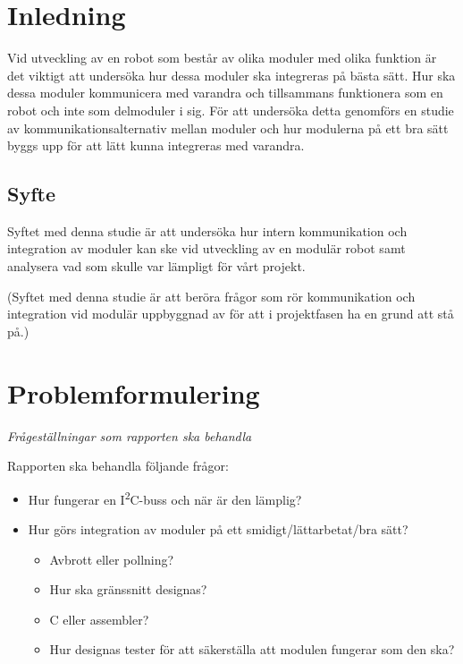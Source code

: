 \documentclass[11pt]{article}
\begin{document}
\begin{flushleft}

\section{Inledning}
Vid utveckling av en robot som består av olika moduler med olika funktion är det viktigt att undersöka hur dessa moduler ska integreras på bästa sätt. Hur ska dessa moduler kommunicera med varandra och tillsammans funktionera som en robot och inte som delmoduler i sig. För att undersöka detta genomförs en studie av kommunikationsalternativ mellan moduler och hur modulerna på ett bra sätt byggs upp för att lätt kunna integreras med varandra. 

\subsection{Syfte}
Syftet med denna studie är att undersöka hur intern kommunikation och integration av moduler kan ske vid utveckling av en modulär robot samt analysera vad som skulle var lämpligt för vårt projekt.

(Syftet med denna studie är att beröra frågor som rör kommunikation och integration vid modulär uppbyggnad av  för att i projektfasen ha en grund att stå på.)

\pagebreak

\section{Problemformulering}
\textit{Frågeställningar som rapporten ska behandla}

Rapporten ska behandla följande frågor:

\begin{itemize}
	\item Hur fungerar en I\textsuperscript{2}C-buss och när är den lämplig?
	\item Hur görs integration av moduler på ett smidigt/lättarbetat/bra sätt?
	
		\begin{itemize}
			\item Avbrott eller pollning?
			\item Hur ska gränssnitt designas?
			\item C eller assembler?
			\item Hur designas tester för att säkerställa att modulen fungerar som den ska?
		\end{itemize}


\end{itemize}
\end{flushleft}
\end{document}
